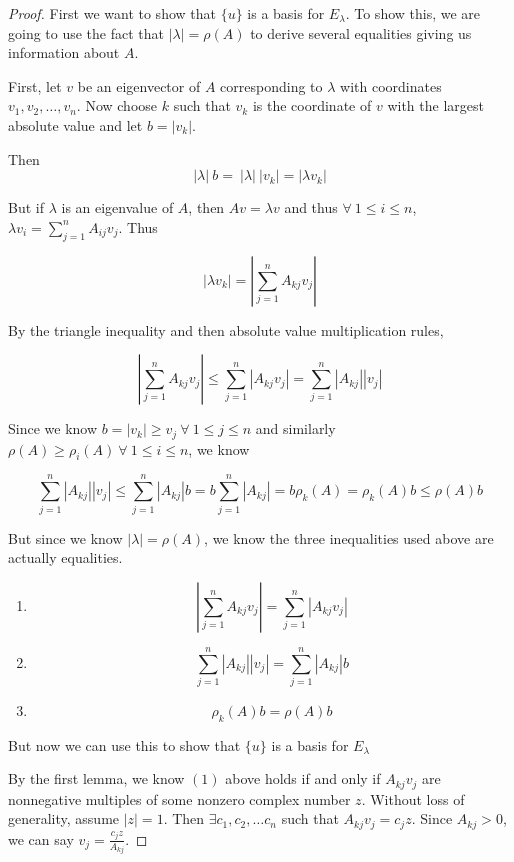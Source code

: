 \documentclass{amsart}
\theoremstyle{definition}
\theoremstyle{remark}
\numberwithin{equation}{section}
\begin{document}
\begin{proof}

First we want to show that $\{ u \}$ is a basis for $E_{\lambda}$.
To show this, we are going to use the fact that $|\lambda| = \rho(A)$ to derive several equalities giving us information about $A$.

First, let $v$ be an eigenvector of $A$ corresponding to $\lambda$ with coordinates $v_1, v_2, \ldots, v_n$.  
Now choose $k$ such that $v_k$ is the coordinate of $v$ with the largest absolute value and let $b = |v_k|$.

Then $$ |\lambda|\ b =\ |\lambda|\ |v_k| = |\lambda v_k| $$

But if $\lambda$ is an eigenvalue of $A$, then $Av = \lambda v$ and thus $\forall\ 1 \leq i \leq n$, $\lambda v_i = \sum_{j = 1}^n A_{ij}v_j$.
Thus

$$ |\lambda v_k| = | \sum_{j = 1}^n A_{kj}v_j | $$

By the triangle inequality and then absolute value multiplication rules,

$$ | \sum_{j = 1}^n A_{kj}v_j | \leq \sum_{j=1}^n |A_{kj}v_j| = \sum_{j=1}^n |A_{kj}| |v_j| $$

Since we know $b = |v_k| \geq v_j\ \forall\ 1 \leq j \leq n$ and similarly $\rho(A) \geq  \rho_i(A)\ \forall\ 1 \leq i \leq n $, we know 

$$ \sum_{j=1}^n |A_{kj}| |v_j|  \leq \sum_{j=1}^n |A_{kj}| b = b \sum_{j=1}^n |A_{kj}| =  b\rho_k(A) = \rho_k(A)b \leq \rho(A)b $$


But since we know $|\lambda| = \rho(A)$, we know the three inequalities used above are actually equalities.

\begin{enumerate}

	\item $$| \sum_{j = 1}^n A_{kj}v_j | = \sum_{j=1}^n |A_{kj}v_j|$$

	\item $$\sum_{j=1}^n |A_{kj}| |v_j|  = \sum_{j=1}^n |A_{kj}| b$$

	\item $$\rho_k(A)b = \rho(A)b$$ \newline

\end{enumerate}



But now we can use this to show that $\{ u \}$ is a basis for $E_{\lambda}$

By the first lemma, we know $(1)$ above holds if and only if $A_{kj}v_j$ are nonnegative multiples of some nonzero complex number $z$.
Without loss of generality, assume $|z| = 1$.
Then $\exists c_1, c_2, \ldots c_n$ such that $A_{kj}v_j = c_j z$.
Since $A_{kj} > 0$, we can say $v_j = \frac{c_jz}{A_{kj}}$.


\end{proof}
\end{document}
